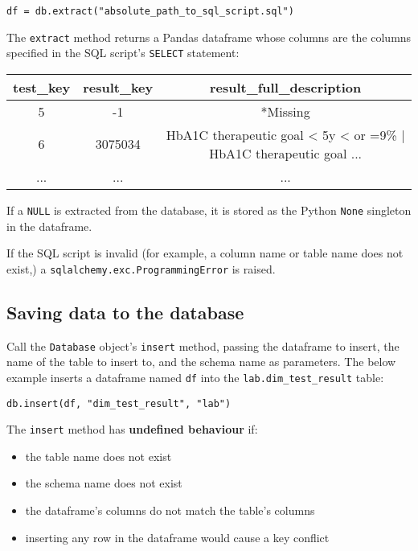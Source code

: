 \documentclass[a4paper]{article}
\begin{document}
\lstset{language=Python}
\begin{lstlisting}
df = db.extract("absolute_path_to_sql_script.sql")
\end{lstlisting}
\lstset{language=}

The \lstinline{extract} method returns a Pandas dataframe whose columns are the columns specified in the SQL script's \lstinline{SELECT} statement:

\begin{table}[H]
\begin{tabular}{|c|c|c|}
\hline
test\_key & result\_key & result\_full\_description \\\hline
5 & -1 & *Missing \\
6 & 3075034 & HbA1C therapeutic goal < 5y < or =9\% | HbA1C therapeutic goal ... \\
... & ... & ... \\\hline
\end{tabular}
\end{table}

If a \lstinline{NULL} is extracted from the database, it is stored as the Python \lstinline{None} singleton in the dataframe.

If the SQL script is invalid (for example, a column name or table name does not exist,) a \lstinline{sqlalchemy.exc.ProgrammingError} is raised.

\subsection{Saving data to the database}

Call the \lstinline{Database} object's \lstinline{insert} method, passing the dataframe to insert, the name of the table to insert to, and the schema name as parameters. The below example inserts a dataframe named \lstinline{df} into the \lstinline{lab.dim_test_result} table:

\lstset{language=Python}
\begin{lstlisting}
db.insert(df, "dim_test_result", "lab")
\end{lstlisting}
\lstset{language=}

The \lstinline{insert} method has \textbf{undefined behaviour} if:

\begin{itemize}
\item the table name does not exist
\item the schema name does not exist
\item the dataframe's columns do not match the table's columns
\item inserting any row in the dataframe would cause a key conflict
\end{itemize}
\end{document}
